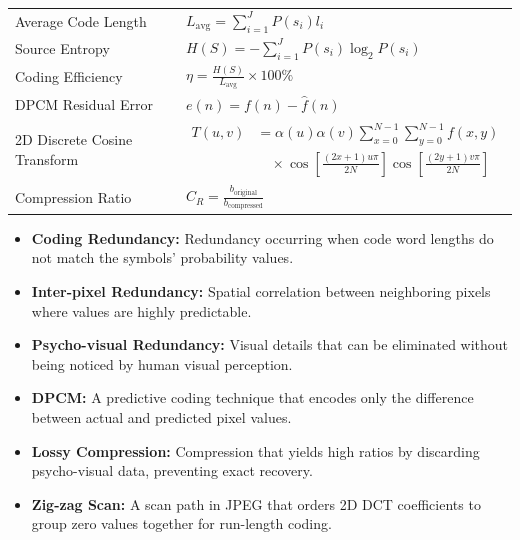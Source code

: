 \documentclass[12pt,a4paper]{article}
\renewcommand{\arraystretch}{1.45}
\begin{document}
\begin{tcolorbox}[formulabox, title={\textbf{Key Formulas at a Glance}}]
\renewcommand{\arraystretch}{1.3}
\begin{tabularx}{\linewidth}{B{4.1cm} Y}
Average Code Length & $L_{\text{avg}} = \sum_{i=1}^J P(s_i) l_i$ \\
Source Entropy & $H(S) = - \sum_{i=1}^J P(s_i) \log_2 P(s_i)$ \\
Coding Efficiency & $\eta = \frac{H(S)}{L_{\text{avg}}} \times 100\%$ \\
DPCM Residual Error & $e(n) = f(n) - \hat{f}(n)$ \\
2D Discrete Cosine Transform &
$\begin{aligned}
 T(u,v) &= \alpha(u)\alpha(v)\sum_{x=0}^{N-1}\sum_{y=0}^{N-1} f(x,y) \\[2pt]
 &\quad\times\cos\left[\frac{(2x+1)u\pi}{2N}\right]
             \cos\left[\frac{(2y+1)v\pi}{2N}\right]
\end{aligned}$ \\[4pt]
Compression Ratio & $C_R = \frac{b_{\text{original}}}{b_{\text{compressed}}}$
\end{tabularx}
\end{tcolorbox}

\begin{tcolorbox}[defbox, title={\textbf{One-Line Definitions}}]
\begin{itemize}[leftmargin=*, itemsep=2.5pt, topsep=0pt]
  \item \textbf{Coding Redundancy:} Redundancy occurring when code word lengths do not match the symbols' probability values.
  \item \textbf{Inter-pixel Redundancy:} Spatial correlation between neighboring pixels where values are highly predictable.
  \item \textbf{Psycho-visual Redundancy:} Visual details that can be eliminated without being noticed by human visual perception.
  \item \textbf{DPCM:} A predictive coding technique that encodes only the difference between actual and predicted pixel values.
  \item \textbf{Lossy Compression:} Compression that yields high ratios by discarding psycho-visual data, preventing exact recovery.
  \item \textbf{Zig-zag Scan:} A scan path in JPEG that orders 2D DCT coefficients to group zero values together for run-length coding.
\end{itemize}
\end{tcolorbox}
\end{document}
